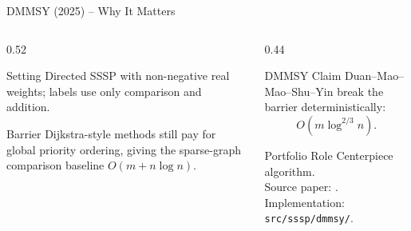 \documentclass[aspectratio=169]{beamer}
\begin{document}
\begin{frame}{DMMSY (2025) -- Why It Matters}
  \small
  \begin{columns}[T]
    \begin{column}{0.52\textwidth}
      \begin{block}{Setting}
        Directed SSSP with non-negative real weights; labels use only comparison and addition.
      \end{block}
      \begin{block}{Barrier}
        Dijkstra-style methods still pay for global priority ordering, giving the sparse-graph comparison baseline $O(m + n \log n)$.
      \end{block}
    \end{column}
    \begin{column}{0.44\textwidth}
      \begin{exampleblock}{DMMSY Claim}
        Duan--Mao--Mao--Shu--Yin break the barrier deterministically:
        $$O\!\left(m \log^{2/3} n\right).$$
      \end{exampleblock}
      \begin{alertblock}{Portfolio Role}
        Centerpiece algorithm.\\Source paper: \cite{duan2025breaking}. \medskip \\Implementation: \texttt{src/sssp/dmmsy/}.
      \end{alertblock}
    \end{column}
  \end{columns}
\end{frame}
\end{document}
